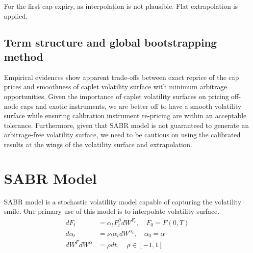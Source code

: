 \documentclass{article}
\begin{document}
For the first cap expiry, as interpolation is not plausible.
Flat extrapolation is applied.

\subsection{Term structure and global bootstrapping method}

Empirical evidences show apparent trade-offs between exact reprice of the cap prices and smoothness of caplet volatility surface with minimum arbitrage opportunities.
Given the importance of caplet volatility surfaces on pricing off-node caps and exotic instruments, we are better off to have a smooth volatility surface while ensuring calibration instrument re-pricing are within an acceptable tolerance.
Furthermore, given that SABR model is not guaranteed to generate an arbitrage-free volatility surface, we need to be cautious on using the calibrated results at the wings of the volatility surface and extrapolation.

\section{SABR Model}

SABR model is a stochastic volatility model capable of capturing the volatility smile.
One primary use of this model is to interpolate volatility surface. 
\begin{subequations} \label{SABR SDEs}
    \begin{align} 
        dF_t &= \alpha_t F_t^{\beta} dW^{F_t}, \quad F_0 = F\left(0, T\right) \label{SABR fwd SDE} \\
        d\alpha_t &= {\nu}_t \alpha_t dW^{\alpha_t}, \quad \alpha_0 = \alpha \label{SABR vol SDE} \\
        dW^{F} dW^{\alpha} &= \rho dt, \quad \rho \in \left[-1, 1\right] \label{SABR rand correl}
    \end{align}
\end{subequations}
\end{document}
